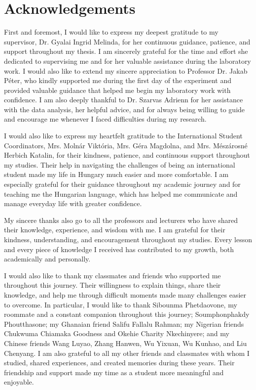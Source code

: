 \chapter*{Acknowledgements}

First and foremost, I would like to express my deepest gratitude to my supervisor, Dr. Gyalai Ingrid Melinda, for her continuous guidance, patience, and support throughout my thesis. I am sincerely grateful for the time and effort she dedicated to supervising me and for her valuable assistance during the laboratory work. I would also like to extend my sincere appreciation to Professor Dr. Jakab Péter, who kindly supported me during the first day of the experiment and provided valuable guidance that helped me begin my laboratory work with confidence. I am also deeply thankful to Dr. Szarvas Adrienn for her assistance with the data analysis, her helpful advice, and for always being willing to guide and encourage me whenever I faced difficulties during my research.

I would also like to express my heartfelt gratitude to the International Student Coordinators, Mrs. Molnár Viktória, Mrs. Géra Magdolna, and Mrs. Mészárosné Herbich Katalin, for their kindness, patience, and continuous support throughout my studies. Their help in navigating the challenges of being an international student made my life in Hungary much easier and more comfortable. I am especially grateful for their guidance throughout my academic journey and for teaching me the Hungarian language, which has helped me communicate and manage everyday life with greater confidence.

My sincere thanks also go to all the professors and lecturers who have shared their knowledge, experience, and wisdom with me. I am grateful for their kindness, understanding, and encouragement throughout my studies. Every lesson and every piece of knowledge I received has contributed to my growth, both academically and personally.

I would also like to thank my classmates and friends who supported me throughout this journey. Their willingness to explain things, share their knowledge, and help me through difficult moments made many challenges easier to overcome. In particular, I would like to thank Sibounma Phetdaovone, my roommate and a constant companion throughout this journey; Soumphonphakdy Phoutthasone; my Ghanaian friend Salifu Fallalu Rahman; my Nigerian friends Chukwuma Chiamaka Goodness and Okehie Charity Nkechinyere; and my Chinese friends Wang Luyao, Zhang Hanwen, Wu Yixuan, Wu Kunhao, and Liu Chenyang. I am also grateful to all my other friends and classmates with whom I studied, shared experiences, and created memories during these years. Their friendship and support made my time as a student more meaningful and enjoyable.

